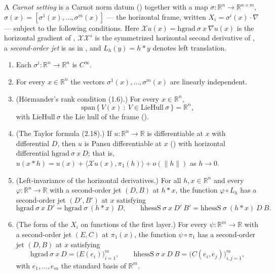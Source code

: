 \begin{definition}
A \emph{Carnot setting} is a Carnot norm datum () together with a map
$\sigma:\mathbb R^n\to\mathbb R^{n\times m}$, $\sigma(x)=[\sigma^1(x),\ldots,\sigma^m(x)]$
--- the horizontal frame, written $X_i=\sigma^i(x)\cdot\nabla$ --- subject to the following
conditions. Here $\mathcal Xu(x)=\mathrm{hgrad}\ \sigma\ x\ \nabla u(x)$ is the horizontal
gradient of , $\mathcal X\mathcal X^{s}$ is the symmetrized horizontal
second derivative of , a \emph{second-order jet} is as in
, and $L_h(y)=h*y$ denotes left translation.
\begin{enumerate}
\item Each $\sigma^i:\mathbb R^n\to\mathbb R^n$ is $C^\infty$.
\item For every $x\in\mathbb R^n$ the vectors $\sigma^1(x),\ldots,\sigma^m(x)$ are linearly
  independent.
\item (H\"ormander's rank condition (1.6).) For every $x\in\mathbb R^n$,
  \[
   \mathrm{span}\,\big\{\,V(x)\ :\ V\in\mathrm{LieHull}\ \sigma\,\big\}=\mathbb R^n,
  \]
  with $\mathrm{LieHull}\ \sigma$ the Lie hull of the frame ().
\item (The Taylor formula (2.18).) If $u:\mathbb R^n\to\mathbb R$ is differentiable at
  $x$ with differential $D$, then $u$ is Pansu differentiable at $x$
  () with horizontal differential
  $\mathrm{hgrad}\ \sigma\ x\ D$; that is,
  $u(x*h)=u(x)+\langle\mathcal Xu(x),\pi_1(h)\rangle+o(\|h\|)$ as $h\to0$.
\item (Left-invariance of the horizontal derivatives.) For all $h,x\in\mathbb R^n$ and
  every $\varphi:\mathbb R^n\to\mathbb R$ with a second-order jet $(D,B)$ at $h*x$, the
  function $\varphi\circ L_h$ has a second-order jet $(D',B')$ at $x$ satisfying
  \[
   \mathrm{hgrad}\ \sigma\ x\ D'=\mathrm{hgrad}\ \sigma\ (h*x)\ D,
   \qquad
   \mathrm{hhessS}\ \sigma\ x\ D'\ B'=\mathrm{hhessS}\ \sigma\ (h*x)\ D\ B .
  \]
\item (The form of the $X_i$ on functions of the first layer.) For every
  $\psi:\mathbb R^m\to\mathbb R$ with a second-order jet $(E,C)$ at $\pi_1(x)$, the
  function $\psi\circ\pi_1$ has a second-order jet $(D,B)$ at $x$ satisfying
  \[
   \mathrm{hgrad}\ \sigma\ x\ D=\big(E(e_i)\big)_{i=1}^{m},
   \qquad
   \mathrm{hhessS}\ \sigma\ x\ D\ B=\big(C(e_i,e_j)\big)_{i,j=1}^{m},
  \]
  with $e_1,\ldots,e_m$ the standard basis of $\mathbb R^m$.
\end{enumerate}


\end{definition}
